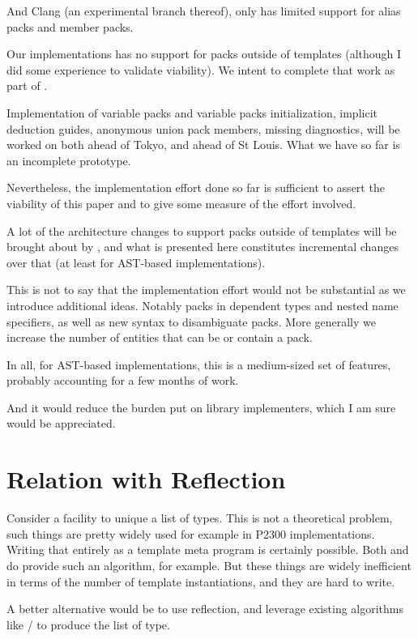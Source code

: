 \documentclass{wg21}
\begin{document}
And Clang (an experimental branch thereof), only has limited support for alias packs and member packs.

Our implementations has no support for packs outside of templates (although I did some experience to validate viability).
We intent to complete that work as part of .

Implementation of variable packs and variable packs initialization, implicit deduction guides, anonymous union pack members,
missing diagnostics, will be worked on both ahead of Tokyo, and ahead of St Louis.
What we have so far is an incomplete prototype.

Nevertheless, the implementation effort done so far is sufficient to assert the viability of this paper and to give some
measure of the effort involved.

A lot of the architecture changes to support packs outside of templates will be brought about by ,
and what is presented here constitutes incremental changes over that (at least for AST-based implementations).

This is not to say that the implementation effort would not be substantial as we introduce additional ideas.
Notably packs in dependent types and nested name specifiers, as well as new syntax to disambiguate packs.
More generally we increase the number of entities that can be or contain a pack.

In all, for AST-based implementations, this is a medium-sized set of features,
probably accounting for a few months of work.

And it would reduce the burden put on library implementers, which I am sure would be appreciated.

\section{Relation with Reflection}

Consider a facility to unique a list of types.
This is not a theoretical problem, such things are pretty widely used for example in P2300 implementations.
Writing that entirely as a template meta program is certainly possible.
Both  and  do provide such an algorithm, for example.
But these things are widely inefficient in terms of the number of template instantiations, and they are hard to write.

A better alternative would be to use reflection, and  leverage existing algorithms like
 /  to produce the list of type.
\end{document}
